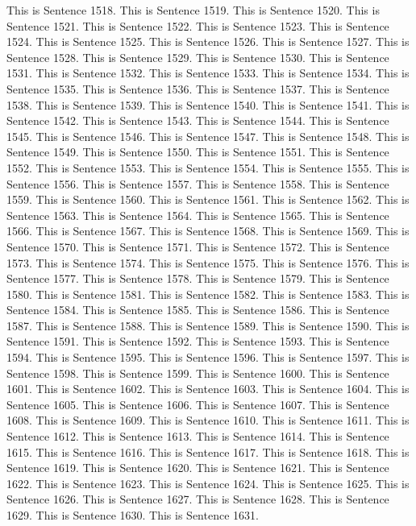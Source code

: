 \documentclass{article}
\begin{document}
This is Sentence 1518.
This is Sentence 1519.
This is Sentence 1520.
This is Sentence 1521.
This is Sentence 1522.
This is Sentence 1523.
This is Sentence 1524.
This is Sentence 1525.
This is Sentence 1526.
This is Sentence 1527.
This is Sentence 1528.
This is Sentence 1529.
This is Sentence 1530.
This is Sentence 1531.
This is Sentence 1532.
This is Sentence 1533.
This is Sentence 1534.
This is Sentence 1535.
This is Sentence 1536.
This is Sentence 1537.
This is Sentence 1538.
This is Sentence 1539.
This is Sentence 1540.
This is Sentence 1541.
This is Sentence 1542.
This is Sentence 1543.
This is Sentence 1544.
This is Sentence 1545.
This is Sentence 1546.
This is Sentence 1547.
This is Sentence 1548.
This is Sentence 1549.
This is Sentence 1550.
This is Sentence 1551.
This is Sentence 1552.
This is Sentence 1553.
This is Sentence 1554.
This is Sentence 1555.
This is Sentence 1556.
This is Sentence 1557.
This is Sentence 1558.
This is Sentence 1559.
This is Sentence 1560.
This is Sentence 1561.
This is Sentence 1562.
This is Sentence 1563.
This is Sentence 1564.
This is Sentence 1565.
This is Sentence 1566.
This is Sentence 1567.
This is Sentence 1568.
This is Sentence 1569.
This is Sentence 1570.
This is Sentence 1571.
This is Sentence 1572.
This is Sentence 1573.
This is Sentence 1574.
This is Sentence 1575.
This is Sentence 1576.
This is Sentence 1577.
This is Sentence 1578.
This is Sentence 1579.
This is Sentence 1580.
This is Sentence 1581.
This is Sentence 1582.
This is Sentence 1583.
This is Sentence 1584.
This is Sentence 1585.
This is Sentence 1586.
This is Sentence 1587.
This is Sentence 1588.
This is Sentence 1589.
This is Sentence 1590.
This is Sentence 1591.
This is Sentence 1592.
This is Sentence 1593.
This is Sentence 1594.
This is Sentence 1595.
This is Sentence 1596.
This is Sentence 1597.
This is Sentence 1598.
This is Sentence 1599.
This is Sentence 1600.
This is Sentence 1601.
This is Sentence 1602.
This is Sentence 1603.
This is Sentence 1604.
This is Sentence 1605.
This is Sentence 1606.
This is Sentence 1607.
This is Sentence 1608.
This is Sentence 1609.
This is Sentence 1610.
This is Sentence 1611.
This is Sentence 1612.
This is Sentence 1613.
This is Sentence 1614.
This is Sentence 1615.
This is Sentence 1616.
This is Sentence 1617.
This is Sentence 1618.
This is Sentence 1619.
This is Sentence 1620.
This is Sentence 1621.
This is Sentence 1622.
This is Sentence 1623.
This is Sentence 1624.
This is Sentence 1625.
This is Sentence 1626.
This is Sentence 1627.
This is Sentence 1628.
This is Sentence 1629.
This is Sentence 1630.
This is Sentence 1631.
\end{document}

